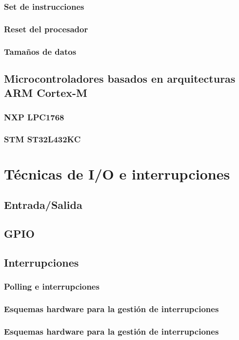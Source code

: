 \documentclass[a4paper]{book}
\begin{document}
\subsection{Set de instrucciones}
\subsection{Reset del procesador}
\subsection{Tamaños de datos}
\section{Microcontroladores basados en arquitecturas ARM Cortex-M}
\subsection{NXP LPC1768}
\subsection{STM ST32L432KC}

\chapter{Técnicas de I/O e interrupciones}
\section{Entrada/Salida}
\section{GPIO}
\section{Interrupciones}
\subsection{Polling e interrupciones}
\subsection{Esquemas hardware para la gestión de interrupciones}
\subsection{Esquemas hardware para la gestión de interrupciones}
\end{document}
